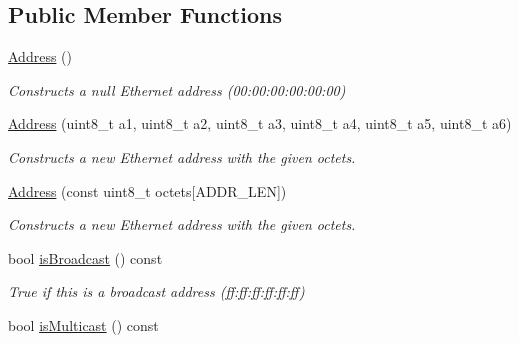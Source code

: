 \subsection*{Public Member Functions}
\begin{DoxyCompactItemize}
\item 
\hyperlink{classndn_1_1util_1_1ethernet_1_1Address_a8d0f500f84b54c803592e37a91bba78d}{Address} ()\hypertarget{classndn_1_1util_1_1ethernet_1_1Address_a8d0f500f84b54c803592e37a91bba78d}{}\label{classndn_1_1util_1_1ethernet_1_1Address_a8d0f500f84b54c803592e37a91bba78d}

\begin{DoxyCompactList}\small\item\em Constructs a null Ethernet address (00\+:00\+:00\+:00\+:00\+:00) \end{DoxyCompactList}\item 
\hyperlink{classndn_1_1util_1_1ethernet_1_1Address_a35d32ce8924810313f1676840e1054b0}{Address} (uint8\+\_\+t a1, uint8\+\_\+t a2, uint8\+\_\+t a3, uint8\+\_\+t a4, uint8\+\_\+t a5, uint8\+\_\+t a6)\hypertarget{classndn_1_1util_1_1ethernet_1_1Address_a35d32ce8924810313f1676840e1054b0}{}\label{classndn_1_1util_1_1ethernet_1_1Address_a35d32ce8924810313f1676840e1054b0}

\begin{DoxyCompactList}\small\item\em Constructs a new Ethernet address with the given octets. \end{DoxyCompactList}\item 
\hyperlink{classndn_1_1util_1_1ethernet_1_1Address_a93377f2324bc08997dc60b268dd23c1b}{Address} (const uint8\+\_\+t octets\mbox{[}A\+D\+D\+R\+\_\+\+L\+EN\mbox{]})\hypertarget{classndn_1_1util_1_1ethernet_1_1Address_a93377f2324bc08997dc60b268dd23c1b}{}\label{classndn_1_1util_1_1ethernet_1_1Address_a93377f2324bc08997dc60b268dd23c1b}

\begin{DoxyCompactList}\small\item\em Constructs a new Ethernet address with the given octets. \end{DoxyCompactList}\item 
bool \hyperlink{classndn_1_1util_1_1ethernet_1_1Address_ad8a0e75a1f31311c0685c43b91997575}{is\+Broadcast} () const\hypertarget{classndn_1_1util_1_1ethernet_1_1Address_ad8a0e75a1f31311c0685c43b91997575}{}\label{classndn_1_1util_1_1ethernet_1_1Address_ad8a0e75a1f31311c0685c43b91997575}

\begin{DoxyCompactList}\small\item\em True if this is a broadcast address (ff\+:ff\+:ff\+:ff\+:ff\+:ff) \end{DoxyCompactList}\item 
bool \hyperlink{classndn_1_1util_1_1ethernet_1_1Address_afdce728acfa10a429de9ee7df584d0b9}{is\+Multicast} () const\hypertarget{classndn_1_1util_1_1ethernet_1_1Address_afdce728acfa10a429de9ee7df584d0b9}{}\label{classndn_1_1util_1_1ethernet_1_1Address_afdce728acfa10a429de9ee7df584d0b9}


\end{DoxyCompactItemize}
